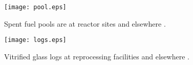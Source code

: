 

  \begin{figure}[htbp!]
    \begin{center}
    \begin{minipage}[t]{0.45\textwidth}
      \texttt{[image: pool.eps]}
      \caption{Spent fuel pools are at reactor sites and elsewhere
        \cite{doe_spent_nodate}.}
        \label{fig:pool}
    \end{minipage}
    \hspace{0.01\textwidth}
    \begin{minipage}[t]{0.45\textwidth}
      \texttt{[image: logs.eps]}
        \caption{Vitrified glass logs at reprocessing facilities and elsewhere 
          \cite{essick_photographing_2012}.}
        \label{fig:logs}
    \end{minipage}
    \end{center}
  \end{figure}
